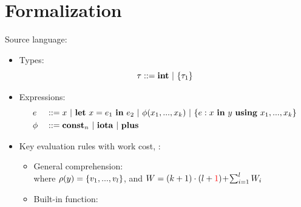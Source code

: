 \documentclass{beamer}
\begin{document}
\section{Formalization}

\begin{frame}{Source language: {\fmsnesl}}
\begin{itemize}
	\item Types: $$\tau ::= \int \ | \ \tseq{\tau_1}$$
 	\item Expressions: 
 	\begin{alignat*}{2}
 	& e &&::=  x \ | \ \Let{x}{e_1}{e_2} \ | \ \hcall{\Tupk{x}} \ | \ \Comp{e}{x}{y}{\usevarsk} \\
 	& \hcall && ::= \*{const}_n \ | \ \*{iota} \ | \ \*{plus} 
 	\end{alignat*}
 	\item Key evaluation rules with work cost,  : \\
 	\begin{itemize}
 	\item General comprehension: \\[1ex]
  where $\rho(y)=\{\replc{l}{v}\}$, and $W =  (k+1)\cdot (l+ {\color{red}1}) \!+\!\sum_{i=1}^{l}W_i $ \\[2ex]
  
   \item Built-in function: 
	\end{itemize}
\end{itemize}
\end{frame}
\end{document}
